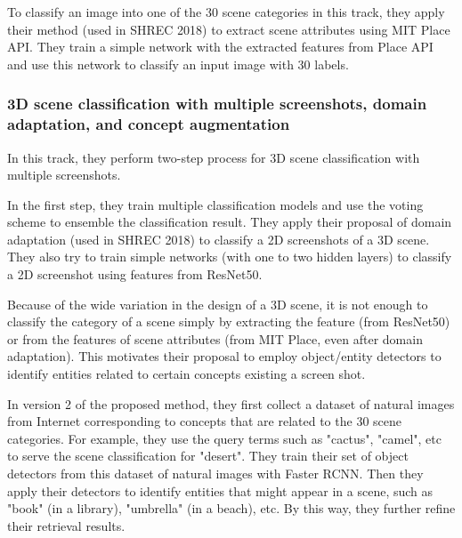 \documentclass[../main.tex]{subfiles}
\begin{document}
	
	To classify an image into one of the 30 scene categories in this track, they apply their method (used in SHREC 2018) to extract scene attributes using MIT Place API. They train a simple network with the extracted features from Place API and use this network to classify an input image with 30 labels.
	
	\subsubsection{3D scene classification with multiple screenshots, domain adaptation, and concept augmentation}
	
	In this track, they perform two-step process for 3D scene classification with multiple screenshots. 
	
	In the first step, they train multiple classification models and use the voting scheme to ensemble the classification result. They apply their proposal of domain adaptation (used in SHREC 2018) to classify a 2D screenshots of a 3D scene. They also try to train simple networks (with one to two hidden layers) to classify a 2D screenshot using features from ResNet50. 
	
	Because of the wide variation in the design of a 3D scene, it is not enough to classify the category of a scene simply by extracting the feature (from ResNet50) or from the features of scene attributes (from MIT Place, even after domain adaptation). This motivates their proposal to employ object/entity detectors to identify entities related to certain concepts existing a screen shot. 
	
	In version 2 of the proposed method, they first collect a dataset of natural images from Internet corresponding to concepts that are related to the 30 scene categories. For example, they use the query terms such as  "cactus", "camel", etc to serve the scene classification for "desert". They train their set of object detectors from this dataset of  natural images with Faster RCNN. Then they apply their detectors to identify  entities that might appear in a scene, such as "book" (in a library), "umbrella" (in a beach), etc. By this way, they further refine their retrieval results.
	
\end{document}

